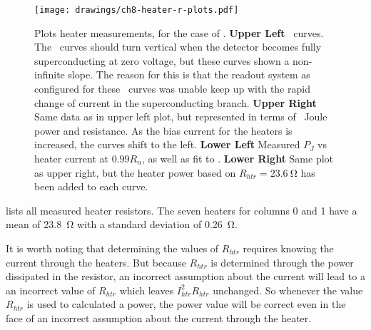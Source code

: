 \begin{figure*}
\texttt{[image: drawings/ch8-heater-r-plots.pdf]}
\caption{Plots heater measurements, for the case of .
\textbf{Upper Left} \IV\ curves. The \IV\ curves should turn vertical when the detector becomes fully superconducting at zero voltage, but these curves shown a non-infinite slope. The reason for this is that the readout system as configured for these \IV\ curves was unable keep up with the rapid change of current in the superconducting branch.
\textbf{Upper Right} Same data as in upper left plot, but represented in terms of \TES\ Joule power and resistance. As the bias current for the heaters is increased, the curves shift to the left.
\textbf{Lower Left} Measured $P_{J}$ vs heater current at $0.99R_n$, as well as fit to .
\textbf{Lower Right} Same plot as upper right, but the heater power based on $R_{htr} = \SI{23.6}{\ohm}$ has been added to each curve.}
\label{fig:heater-r-plots}
\end{figure*}

 lists all measured heater resistors.
The seven heaters for columns 0 and 1 have a mean of \SI{23.8}{\ohm} with a standard deviation of \SI{0.26}{\ohm}.

It is worth noting that determining the values of $R_{htr}$ requires knowing the current through the heaters.
But because $R_{htr}$ is determined through the power dissipated in the resistor, an incorrect assumption about the current will lead to a an incorrect value of $R_{htr}$ which leaves $I_{htr}^2 R_{htr}$ unchanged.
So whenever the value $R_{htr}$ is used to calculated a power, the power value will be correct even in the face of an incorrect assumption about the current through the heater.

